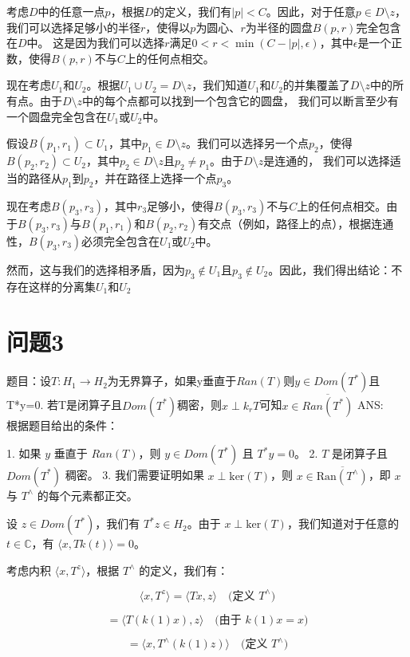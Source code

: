 \documentclass[12pt, a4paper, oneside]{ctexart}
\begin{document}
\begin{spacing}{2.0}
考虑$D$中的任意一点$p$，根据$D$的定义，我们有$|p| < C$。因此，对于任意$p \in D\setminus z$，我们可以选择足够小的半径$r$，使得以$p$为圆心、$r$为半径的圆盘$B(p, r)$完全包含在$D$中。
这是因为我们可以选择$r$满足$0 < r < \min(C - |p|, \epsilon)$，其中$\epsilon$是一个正数，使得$B(p, r)$不与$C$上的任何点相交。

现在考虑$U_1$和$U_2$。根据$U_1 \cup U_2 = D\setminus z$，我们知道$U_1$和$U_2$的并集覆盖了$D\setminus z$中的所有点。由于$D\setminus z$中的每个点都可以找到一个包含它的圆盘，
我们可以断言至少有一个圆盘完全包含在$U_1$或$U_2$中。

假设$B(p_1, r_1) \subset U_1$，其中$p_1 \in D\setminus z$。我们可以选择另一个点$p_2$，使得$B(p_2, r_2) \subset U_2$，其中$p_2 \in D\setminus z$且$p_2 \neq p_1$。由于$D\setminus z$是连通的，
我们可以选择适当的路径从$p_1$到$p_2$，并在路径上选择一个点$p_3$。

现在考虑$B(p_3, r_3)$，其中$r_3$足够小，使得$B(p_3, r_3)$不与$C$上的任何点相交。由于$B(p_3, r_3)$与$B(p_1, r_1)$和$B(p_2, r_2)$有交点（例如，路径上的点），根据连通性，$B(p_3, r_3)$必须完全包含在$U_1$或$U_2$中。

然而，这与我们的选择相矛盾，因为$p_3 \notin U_1$且$p_3 \notin U_2$。因此，我们得出结论：不存在这样的分离集$U_1$和$U_2$


\section{问题3}
题目：设$T:H_1\to H_2$为无界算子，如果y垂直于$Ran(T)$则$y\in Dom(T^*)$且T*y=0. 若T是闭算子且$Dom(T^*)$稠密，则$x\perp k_rT$可知$x\in \overline{Ran(T^*)}$
ANS:\\
根据题目给出的条件：

1. 如果 $y$ 垂直于 $Ran(T)$，则 $y \in Dom(T^*)$ 且 $T^*y = 0$。
2. $T$ 是闭算子且 $Dom(T^*)$ 稠密。
3. 我们需要证明如果 $x \perp \text{ker}(T)$，则 $x \in \overline{\text{Ran}(T^{\land})}$，即 $x$ 与 $T^{\land}$ 的每个元素都正交。

设 $z \in Dom(T^*)$，我们有 $T^*z \in H_2$。由于 $x \perp \text{ker}(T)$，我们知道对于任意的 $t \in \mathbb{C}$，有 $\langle x, Tk(t) \rangle = 0$。

考虑内积 $\langle x, T^z \rangle$，根据 $T^{\land}$ 的定义，我们有：

\[
\langle x, T^z \rangle = \langle Tx, z \rangle \quad \text{(定义 $T^{\land}$)}
\]

\[
= \langle T(k(1)x), z \rangle \quad \text{(由于 $k(1)x = x$)}
\]

\[
= \langle x, T^{\land}(k(1)z) \rangle \quad \text{(定义 $T^{\land}$)}
\]


\end{spacing}
\end{document}
